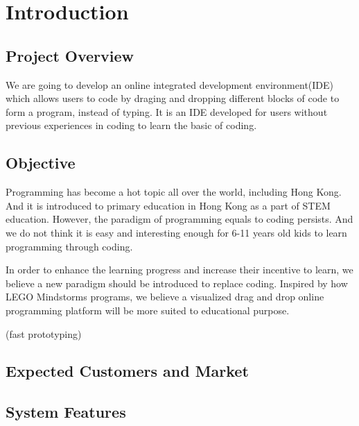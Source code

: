 \documentclass[CSCI3100_Documentation]{subfiles}
\begin{document}
  \section{Introduction}
  \subsection{Project Overview}
  We are going to develop an online integrated development environment(IDE) which allows users to code by draging and dropping different blocks of code to form a program, instead of typing. It is an IDE developed for users without previous experiences in coding to learn the basic of coding.
  \subsection{Objective}
  Programming has become a hot topic all over the world, including Hong Kong. And it is introduced to primary education in Hong Kong as a part of STEM education. However, the paradigm of programming equals to coding persists. And we do not think it is easy and interesting enough for 6-11 years old kids to learn programming through coding.

  In order to enhance the learning progress and increase their incentive to learn, we believe a new paradigm should be introduced to replace coding. Inspired by how LEGO\textsuperscript{\textregistered} Mindstorms\textsuperscript{\textregistered} programs, we believe a visualized drag and drop online programming platform will be more suited to educational purpose.

  (fast prototyping)
  \subsection{Expected Customers and Market}
  \subsection{System Features}
\end{document}
